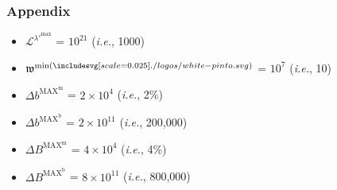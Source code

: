 \documentclass[class=article, crop=false]{standalone}
\begin{document}

\subsubsection{Appendix}

\begin{itemize}[topsep=0pt, itemsep=3pt,leftmargin=16pt]
    \item $\mathscr{L}^{\lambda'^{\text{max}}}$ = $10^{21}$ (\textit{i.e.}, 1000)
    \item $\mathfrak{w}^{\text{min}(\pinto)}$ = $10^{7}$ (\textit{i.e.}, 10)
    \item $\Delta b^{\text{MAX}^{\text{m}}}$ = $2 \times 10^{4}$ (\textit{i.e.}, 2\%)
    \item $\Delta b^{\text{MAX}^{\text{b}}}$ = $2 \times 10^{11}$ (\textit{i.e.}, 200,000)
    \item $\Delta B^{\text{MAX}^{\text{m}}}$ = $4 \times 10^{4}$ (\textit{i.e.}, 4\%)
    \item $\Delta B^{\text{MAX}^{\text{b}}}$ = $8 \times 10^{11}$ (\textit{i.e.}, 800,000)
\end{itemize}
\end{document}
